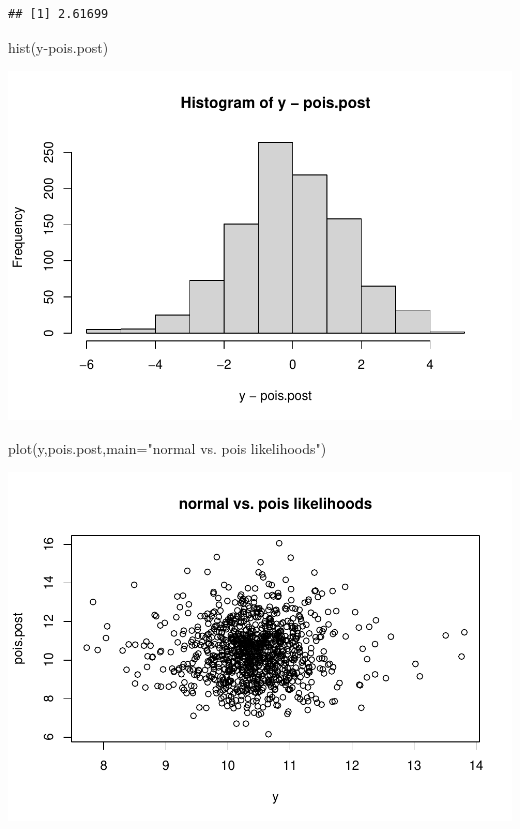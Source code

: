 \documentclass[
]{book}
\newenvironment{Shaded}{\begin{snugshade}}{\end{snugshade}}
\newcommand{\AttributeTok}[1]{\textcolor[rgb]{0.77,0.63,0.00}{#1}}
\newcommand{\FunctionTok}[1]{\textcolor[rgb]{0.00,0.00,0.00}{#1}}
\newcommand{\NormalTok}[1]{#1}
\newcommand{\SpecialCharTok}[1]{\textcolor[rgb]{0.00,0.00,0.00}{#1}}
\newcommand{\StringTok}[1]{\textcolor[rgb]{0.31,0.60,0.02}{#1}}
\theoremstyle{definition}
\theoremstyle{definition}
\theoremstyle{definition}
\theoremstyle{definition}
\theoremstyle{remark}
\begin{document}
\begin{verbatim}
## [1] 2.61699
\end{verbatim}

\begin{Shaded}
\begin{Highlighting}[]
 \FunctionTok{hist}\NormalTok{(y}\SpecialCharTok{{-}}\NormalTok{pois.post)}
\end{Highlighting}
\end{Shaded}

\includegraphics{_main_files/figure-latex/unnamed-chunk-41-1.pdf}

\begin{Shaded}
\begin{Highlighting}[]
 \FunctionTok{plot}\NormalTok{(y,pois.post,}\AttributeTok{main=}\StringTok{"normal vs. pois likelihoods"}\NormalTok{)}
\end{Highlighting}
\end{Shaded}

\includegraphics{_main_files/figure-latex/unnamed-chunk-41-2.pdf}
\end{document}
